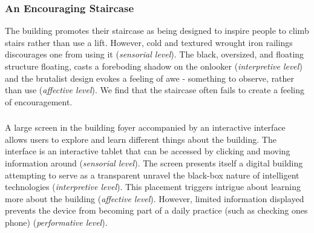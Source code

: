 \documentclass[manuscript, anonymous, review]{acmart}
\begin{document}
\subsubsection*{An Encouraging Staircase}
The building promotes their staircase as being designed to inspire people to climb stairs rather than use a lift. However, cold and textured wrought iron railings discourages one from using it (\textit{sensorial level}). The black, oversized, and floating structure floating, casts a foreboding  shadow on the onlooker  (\textit{interpretive level}) and the brutalist design evokes a feeling of awe - something to observe, rather than use (\textit{affective level}). We find that the staircase often fails to create a feeling of encouragement.

\subsubsection*{}
A large screen in the building foyer accompanied by an interactive interface allows users to explore and learn different things about the building. The interface is an interactive tablet that can be accessed by clicking and moving information around (\textit{sensorial level}). The screen presents itself a digital building attempting to serve as a transparent unravel the black-box  nature of intelligent technologies (\textit{interpretive level}). This placement triggers intrigue about learning more about the building (\textit{affective level}). However, limited information displayed prevents the device from becoming part of a daily practice (such as checking ones phone) (\textit{performative level}). 


\end{document}
